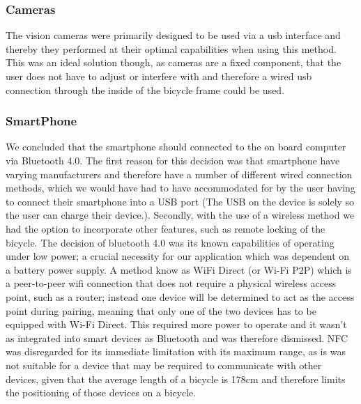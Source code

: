 \documentclass[a4paper]{report}
\begin{document}
{\subsubsection{Cameras}
The vision cameras were primarily designed to be used via a usb interface and thereby they performed at their optimal capabilities when using this method. This was an ideal solution though, as cameras are a fixed component, that the user does not have to adjust or interfere with and therefore a wired usb connection through the inside of the bicycle frame could be used. 

\subsubsection{SmartPhone}We concluded that the smartphone should connected to the on board computer via Bluetooth 4.0. The first reason for this decision was that smartphone have varying manufacturers and therefore have a number of different wired connection methods, which we would have had to have accommodated for by the user having to connect their smartphone into a USB port (The USB on the device is solely so the user can charge their device.). Secondly, with the use of a wireless method we had the option to incorporate other features, such as remote locking of the bicycle. The decision of bluetooth 4.0 was its known capabilities of operating under low power; a crucial necessity for our application which was dependent on a battery power supply. A method know as WiFi Direct (or Wi-Fi P2P) which is a peer-to-peer wifi connection that does not require a physical wireless access point, such as a router; instead one device will be determined to act as the access point during pairing, meaning that only one of the two devices has to be equipped with Wi-Fi Direct.  This required more power to operate and it wasn't as integrated into smart devices as Bluetooth and was therefore dismissed. NFC was disregarded for its immediate limitation with its maximum range, as is was not suitable for a device that may be required to communicate with other devices, given that the average length of a bicycle is 178cm and therefore limits the positioning of those devices on a bicycle. 

}
\end{document}
